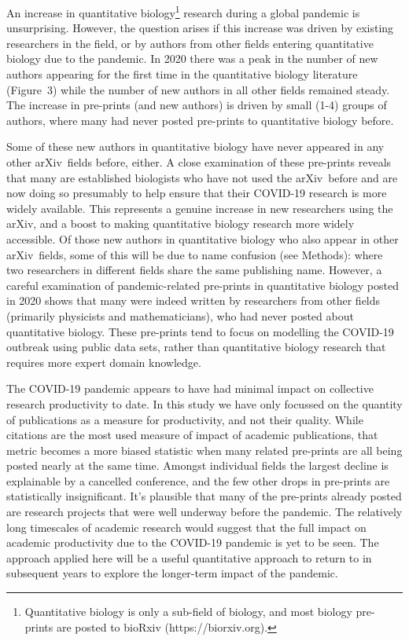 \documentclass[a4paper,12pt]{article}
\newcommand{\arxiv}{arXiv}
\begin{document}
An increase in quantitative biology\footnote{Quantitative biology is only a sub-field of biology, and most biology pre-prints are posted to bioRxiv ({https://biorxiv.org}).} research during a global pandemic is unsurprising. However, the question arises if this increase was driven by existing researchers in the field, or by authors from other fields entering quantitative biology due to the pandemic. In 2020 there was a peak in the number of new authors appearing for the first time in the quantitative biology literature (Figure~3) while the number of new authors in all other fields remained steady. The increase in pre-prints (and new authors) is driven by small (1-4) groups of authors, where many had never posted pre-prints to quantitative biology before.


Some of these new authors in quantitative biology have never appeared in any other \arxiv\ fields before, either. A close examination of these pre-prints reveals that many are established biologists who have not used the \arxiv\ before and are now doing so presumably to help ensure that their COVID-19 research is more widely available. This represents a genuine increase in new researchers using the \arxiv, and a boost to making quantitative biology research more widely accessible. Of those new authors in quantitative biology who also appear in other \arxiv\ fields, some of this will be due to name confusion (see Methods): where two researchers in different fields share the same publishing name. However, a careful examination of pandemic-related pre-prints in quantitative biology posted in 2020 shows that many were indeed written by researchers from other fields (primarily physicists and mathematicians), who had never posted about quantitative biology. These pre-prints tend to focus on modelling the COVID-19 outbreak using public data sets, rather than quantitative biology research that requires more expert domain knowledge. 





The COVID-19 pandemic appears to have had minimal impact on collective research productivity to date. In this study we have only focussed on the quantity of publications as a measure for productivity, and not their quality. While citations are the most used measure of impact of academic publications, that metric becomes a more biased statistic when many related pre-prints are all being posted nearly at the same time\cite{Fassin:2021}. Amongst individual fields the largest decline is explainable by a cancelled conference, and the few other drops in pre-prints are statistically insignificant. It's plausible that many of the pre-prints already posted are research projects that were well underway before the pandemic. The relatively long timescales of academic research would suggest that the full impact on academic productivity due to the COVID-19 pandemic is yet to be seen. The approach applied here will be a useful quantitative approach to return to in subsequent years to explore the longer-term impact of the pandemic.
\end{document}
